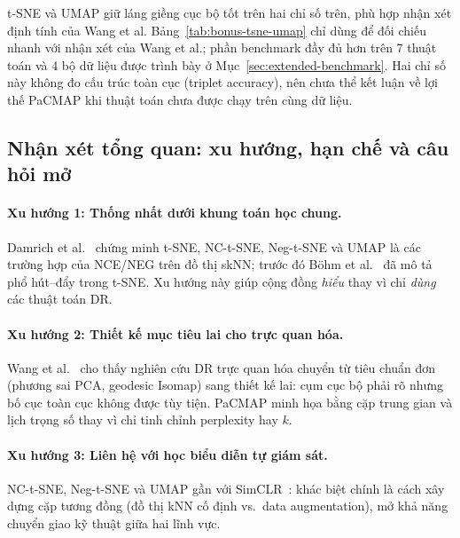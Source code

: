 t-SNE và UMAP giữ láng giềng cục bộ tốt trên hai chỉ số trên, phù hợp nhận xét định tính của Wang et al. Bảng~\ref{tab:bonus-tsne-umap} chỉ dùng để đối chiếu nhanh với nhận xét của Wang et al.; phần benchmark đầy đủ hơn trên 7 thuật toán và 4 bộ dữ liệu được trình bày ở Mục~\ref{sec:extended-benchmark}. Hai chỉ số này không đo cấu trúc toàn cục (triplet accuracy), nên chưa thể kết luận về lợi thế PaCMAP khi thuật toán chưa được chạy trên cùng dữ liệu.

\subsection{Nhận xét tổng quan: xu hướng, hạn chế và câu hỏi mở}
\label{sec:research-trends}

\paragraph{Xu hướng 1: Thống nhất dưới khung toán học chung.}
Damrich et al.~\cite{damrich2023contrastive} chứng minh t-SNE, NC-t-SNE, Neg-t-SNE và UMAP là các trường hợp của NCE/NEG trên đồ thị skNN; trước đó Böhm et al.~\cite{bohm2022attraction} đã mô tả phổ hút--đẩy trong t-SNE. Xu hướng này giúp cộng đồng \emph{hiểu} thay vì chỉ \emph{dùng} các thuật toán DR.

\paragraph{Xu hướng 2: Thiết kế mục tiêu lai cho trực quan hóa.}
Wang et al.~\cite{wang2021pacmap} cho thấy nghiên cứu DR trực quan hóa chuyển từ tiêu chuẩn đơn (phương sai PCA, geodesic Isomap) sang thiết kế lai: cụm cục bộ phải rõ nhưng bố cục toàn cục không được tùy tiện. PaCMAP minh họa bằng cặp trung gian và lịch trọng số thay vì chỉ tinh chỉnh perplexity hay $k$.

\paragraph{Xu hướng 3: Liên hệ với học biểu diễn tự giám sát.}
NC-t-SNE, Neg-t-SNE và UMAP gần với SimCLR~\cite{damrich2023contrastive}: khác biệt chính là cách xây dựng cặp tương đồng (đồ thị kNN cố định vs.\ data augmentation), mở khả năng chuyển giao kỹ thuật giữa hai lĩnh vực.

